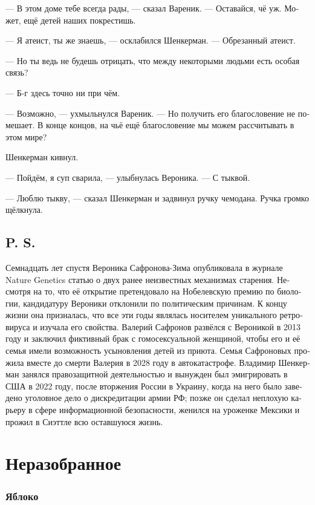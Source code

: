 \documentclass[a5paper,12pt,fleqn]{extbook}\usepackage{cooltooltips}\usepackage{polyglossia}\setdefaultlanguage[babelshorthands=true]{russian}\setotherlanguage{english}\defaultfontfeatures{Ligatures=TeX,Mapping=tex-text} \usepackage{xcolor}\definecolor{lightgray}{HTML}{bbbbbb}\color{lightgray}\newcommand{\ml}[3]{\textenglish{\textcolor{black}{#3}}}
\begin{document}
--- В этом доме тебе всегда рады, --- сказал Вареник.
--- Оставайся, чё уж.
Может, ещё детей наших покрестишь.

--- Я атеист, ты же знаешь, --- осклабился Шенкерман.
--- Обрезанный атеист.

--- Но ты ведь не будешь отрицать, что между некоторыми людьми есть особая связь?

--- Б-г здесь точно ни при чём.

--- Возможно, --- ухмыльнулся Вареник.
--- Но получить его благословение не помешает.
В конце концов, на чьё ещё благословение мы можем рассчитывать в этом мире?

Шенкерман кивнул.

--- Пойдём, я суп сварила, --- улыбнулась Вероника.
--- С тыквой.

--- Люблю тыкву, --- сказал Шенкерман и задвинул ручку чемодана.
Ручка громко щёлкнула.

\newpage

\section*{P. S.}

Семнадцать лет спустя Вероника Сафронова-Зима опубликовала в журнале Nature Genetics статью о двух ранее неизвестных механизмах старения.
Несмотря на то, что её открытие претендовало на Нобелевскую премию по биологии, кандидатуру Вероники отклонили по политическим причинам.
К концу жизни она призналась, что все эти годы являлась носителем уникального ретровируса и изучала его свойства.
Валерий Сафронов развёлся с Вероникой в 2013 году и заключил фиктивный брак с гомосексуальной женщиной, чтобы его и её семья имели возможность усыновления детей из приюта.
Семья Сафроновых прожила вместе до смерти Валерия в 2028 году в автокатастрофе.
Владимир Шенкерман занялся правозащитной деятельностью и вынужден был эмигрировать в США в 2022 году, после вторжения России в Украину, когда на него было заведено уголовное дело о дискредитации армии РФ;
позже он сделал неплохую карьеру в сфере информационной безопасности, женился на уроженке Мексики и прожил в Сиэттле всю оставшуюся жизнь.

\chapter{Неразобранное}

\subsection{Яблоко}
\end{document}

